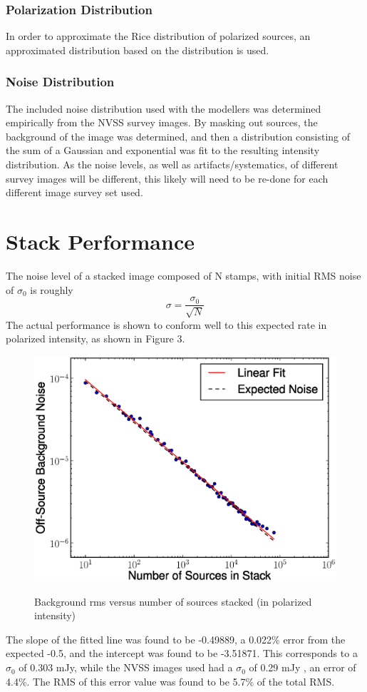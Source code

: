 \documentclass{article}
\begin{document}
\subsubsection{Polarization Distribution}
In order to approximate the Rice distribution of polarized sources, an
approximated distribution based on the \cite[Beck \& Gaensler 2004]{BandG2004}
distribution is used.

\subsubsection{Noise Distribution}
The included noise distribution used with the modellers was determined 
empirically from the NVSS survey images.  By masking out sources, the background
of the image was determined, and then a distribution consisting of the sum of a
Gaussian and exponential \cite[Stil et al. 2014]{stil2014} was fit to the 
resulting intensity distribution.  As the noise levels, as well as 
artifacts/systematics, of different survey images will be different, this 
likely will need to be re-done for each different image survey set used.

\section{Stack Performance}
The noise level of a stacked image composed of N stamps, with initial RMS noise of $\sigma_0$ is roughly 
$$ \sigma = \frac{\sigma_0}{\sqrt{N}}$$
The actual performance is shown to conform well to this expected rate in 
polarized intensity, as shown in Figure 3.
\begin{figure}[H]
\centering
\includegraphics[trim=0cm 0cm 0cm 0cm, clip, scale=0.7]{Noise_vs_Num.eps}\\
\caption[Stacking Performance for NVSS PI]{Background rms versus number of 
sources stacked (in polarized intensity)}
\end{figure}
The slope of the fitted line was found to be -0.49889, a 0.022\% error from the expected -0.5, and the intercept was found to be -3.51871.  This corresponds
to a $\sigma_0$ of 0.303 mJy, while the NVSS images used had a $\sigma_0$ of 
0.29 mJy \cite[Condon et al. 1998]{NVSS1998}, an error of 4.4\%.  The RMS of 
this error value was found to be 5.7\% of the total RMS.\par
\end{document}
